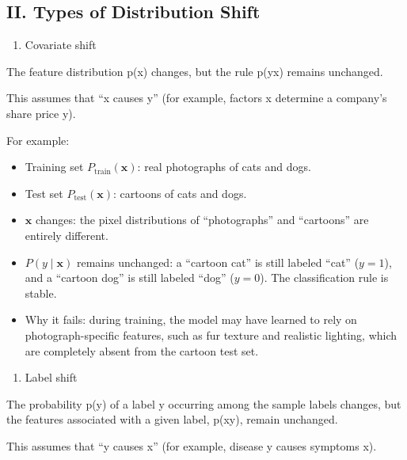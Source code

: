 \hypertarget{ii.-types-of-distribution-shift}{%
\subsection{II. Types of Distribution Shift}\label{ii.-types-of-distribution-shift}}

\begin{enumerate}
\def\labelenumi{\arabic{enumi}.}
\tightlist
\item
  Covariate shift
\end{enumerate}

The feature distribution p(x) changes, but the rule p(y\textbar x) remains unchanged.

This assumes that ``x causes y'' (for example, factors x determine a company's share price y).

For example:

\begin{itemize}
\tightlist
\item
  Training set \(P_{\mathrm{train}}(\mathbf{x})\): real photographs of cats and dogs.
\item
  Test set \(P_{\mathrm{test}}(\mathbf{x})\): cartoons of cats and dogs.
\item
  \(\mathbf{x}\) changes: the pixel distributions of ``photographs'' and ``cartoons'' are entirely different.
\item
  \(P(y\mid \mathbf{x})\) remains unchanged: a ``cartoon cat'' is still labeled ``cat'' (\(y=1\)), and a ``cartoon dog'' is still labeled ``dog'' (\(y=0\)). The classification rule is stable.
\item
  Why it fails: during training, the model may have learned to rely on photograph-specific features, such as fur texture and realistic lighting, which are completely absent from the cartoon test set.
\end{itemize}

\begin{enumerate}
\def\labelenumi{\arabic{enumi}.}
\setcounter{enumi}{1}
\tightlist
\item
  Label shift
\end{enumerate}

The probability p(y) of a label y occurring among the sample labels changes, but the features associated with a given label, p(x\textbar y), remain unchanged.

This assumes that ``y causes x'' (for example, disease y causes symptoms x).

